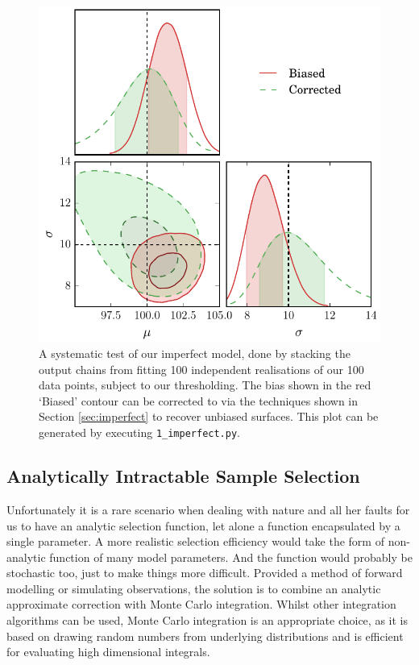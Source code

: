 \documentclass[a4paper,fleqn,usenatbib]{mnras}
\begin{document}
\begin{figure}
	\begin{center}
		\includegraphics[width=\columnwidth]{fig_1_imperfect.pdf}
	\end{center}
	\caption{A systematic test of our imperfect model, done by stacking the output chains from fitting 100 independent realisations of our 100 data points, subject to our thresholding. The bias shown in the red `Biased' contour can be corrected to via the techniques shown in Section \ref{sec:imperfect} to recover unbiased surfaces. This plot can be generated by executing  \mbox{\texttt{1\_imperfect.py}}.}
	\label{fig:imperfect}
\end{figure}












\subsection{Analytically Intractable Sample Selection}
\label{sec:real}
Unfortunately it is a rare scenario when dealing with nature and all her faults for us to have an analytic selection function, let alone a function encapsulated by a single parameter. A more realistic selection efficiency would take the form of non-analytic function of many model parameters. And the function would probably be stochastic too, just to make things more difficult. Provided a method of forward modelling or simulating observations, the solution is to combine an analytic approximate correction with Monte Carlo integration. Whilst other integration algorithms can be used, Monte Carlo integration is an appropriate choice, as it is based on drawing random numbers from underlying distributions and is efficient for evaluating high dimensional integrals.
\end{document}
